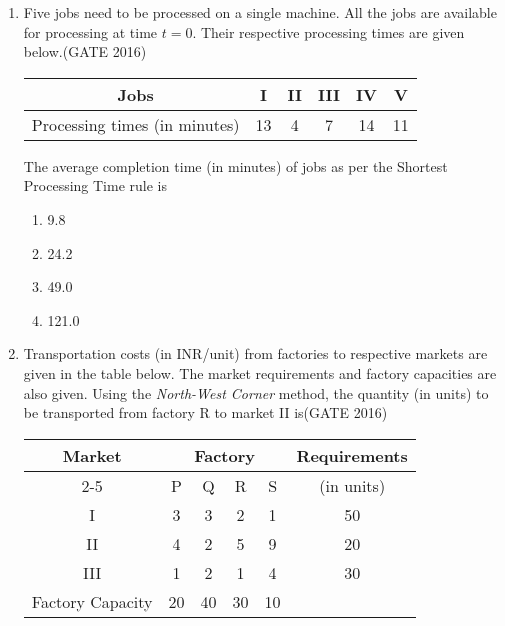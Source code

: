 \documentclass[journal,12pt,onecolumn]{IEEEtran}
\theoremstyle{remark}
\begin{document}
\begin{enumerate}
\vspace{0.5cm}


\item Five jobs need to be processed on a single machine. All the jobs are available for processing at time $t = 0$. Their respective processing times are given below.\hfill{(GATE 2016)}

\begin{center}
\begin{tabular}{|c|c|c|c|c|c|}
\hline
Jobs & I & II & III & IV & V \\
\hline
Processing times (in minutes) & 13 & 4 & 7 & 14 & 11 \\
\hline
\end{tabular}
\end{center}

The average completion time (in minutes) of jobs as per the Shortest Processing Time rule is
\begin{multicols}{4}
\begin{enumerate}
    \item 9.8
    \item 24.2
    \item 49.0
    \item 121.0
\end{enumerate}
\end{multicols}
\vspace{0.5cm}
\newpage
\item Transportation costs (in INR/unit) from factories to respective markets are given in the table below.
The market requirements and factory capacities are also given. Using the \textit{North-West Corner} method, the quantity (in units) to be transported from factory R to market II is\hfill{(GATE 2016)}

\begin{center}
\begin{tabular}{|c|c|c|c|c|c|}
\hline
\multirow{2}{*}{Market} & \multicolumn{4}{c|}{Factory} & \multirow{2}{*}{Requirements} \\
\cline{2-5}
 & P & Q & R & S & (in units) \\
\hline
I   & 3 & 3 & 2 & 1 & 50 \\
II  & 4 & 2 & 5 & 9 & 20 \\
III & 1 & 2 & 1 & 4 & 30 \\
\hline
\multicolumn{1}{|c|}{Factory Capacity} & 20 & 40 & 30 & 10 & \\
\hline
\end{tabular}
\end{center}


\end{enumerate}
\end{document}
